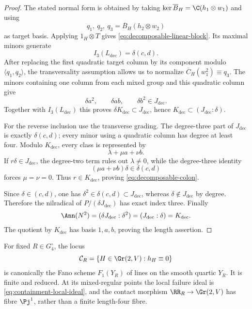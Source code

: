 \begin{proof}
The stated normal form is obtained by taking
\(\ker\overline B_H=\C(h_1\otimes w_1)\) and using
\[
 q_1,\ q_2,\ q_3=\overline B_H(h_2\otimes w_2)
\]
as target basis.  Applying \(1_H\otimes T\) gives
\eqref{eq:decomposable-linear-block}.  Its maximal minors generate
\[
 I_3(L_{\mathrm{dec}})=\delta(c,d).
\]
After replacing the first quadratic target column by its component
modulo \(\langle q_1,q_2\rangle\), the transversality assumption
allows us to normalize
\(\overline C_H(w_1^2)\equiv q_3\).  The minors containing one
column from each mixed group and this quadratic column give
\[
 \delta a^2,\qquad \delta ab,\qquad \delta b^2
 \in J_{\mathrm{dec}}.
\]
Together with \(I_3(L_{\mathrm{dec}})\) this proves
\(\delta K_{\mathrm{dec}}\subset J_{\mathrm{dec}}\), hence
\(K_{\mathrm{dec}}\subset(J_{\mathrm{dec}}:\delta)\).

For the reverse inclusion use the transverse grading.
The degree-three part of \(J_{\mathrm{dec}}\) is exactly
\(\delta(c,d)\); every minor using a quadratic column has degree at
least four.  Modulo \(K_{\mathrm{dec}}\), every class is represented
by
\[
 \lambda+\mu a+\nu b.
\]
If \(r\delta\in J_{\mathrm{dec}}\), the degree-two term rules out
\(\lambda\ne0\), while the degree-three identity
\[
 (\mu a+\nu b)\delta\in\delta(c,d)
\]
forces \(\mu=\nu=0\).  Thus \(r\in K_{\mathrm{dec}}\), proving
\eqref{eq:decomposable-colon}.

Since \(\delta\in(c,d)\), one has
\(\delta^2\in\delta(c,d)\subset J_{\mathrm{dec}}\), whereas
\(\delta\notin J_{\mathrm{dec}}\) by degree.  Therefore the
nilradical of \(P/(\delta J_{\mathrm{dec}})\) has exact index three.
Finally
\[
 \Ann(N^2)
 =(\delta J_{\mathrm{dec}}:\delta^2)
 =(J_{\mathrm{dec}}:\delta)
 =K_{\mathrm{dec}}.
\]
The quotient by \(K_{\mathrm{dec}}\) has basis \(1,a,b\), proving the
length assertion.
\end{proof}

\begin{proposition}
\label{prop:containment-lines}
For fixed \(R\in G_4^\circ\), the locus
\[
 \mathcal C_R=\{H\in\Gr(2,V):h_H\equiv0\}
\]
is canonically the Fano scheme \(F_1(Y_R)\) of lines on the smooth
quartic \(Y_R\).  It is finite and reduced.  At its mixed-regular
points the local failure ideal is
\eqref{eq:containment-local-ideal}, and the contact morphism
\(\RR_R\to\Gr(2,V)\) has fibre \(\Pj^1\), rather than a finite
length-four fibre.
\end{proposition}

